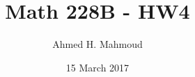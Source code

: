\documentclass[12pt]{article}
\begin{document}
\title{Math 228B - HW4}
\author{Ahmed H. Mahmoud}
\date{15 March 2017} 

\maketitle

\newcommand{\cn}{Crank-Nicolson}
\newcommand{\lw}{Lax-Wendroff}


\newpage



\newpage




\end{document}
